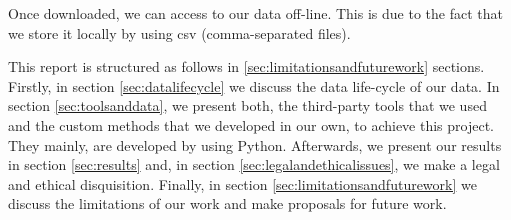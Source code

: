 Once downloaded, we can access to our data off-line. This is due to the fact that we store it locally by using csv (comma-separated files).

This report is structured as follows in \ref{sec:limitationsandfuturework} sections. Firstly, in section \ref{sec:datalifecycle} we discuss the data life-cycle of our data. In section  \ref{sec:toolsanddata}, we present both, the third-party tools that we used and the custom methods that we developed in our own, to achieve this project. They mainly, are developed by using Python.  Afterwards, we present our results in section \ref{sec:results} and, in section \ref{sec:legalandethicalissues}, we make a legal and ethical disquisition. Finally, in section \ref{sec:limitationsandfuturework} we discuss the limitations of our work and make proposals for future work.